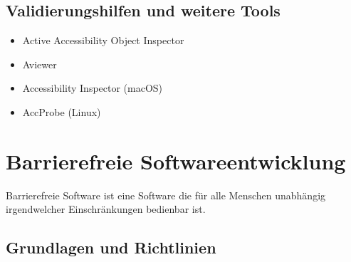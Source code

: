 \documentclass[paper=a4, fontsize=11pt]{scrartcl} %
\numberwithin{equation}{section} %
\numberwithin{figure}{section} %
\numberwithin{table}{section} %
\begin{document}
\subsection{Validierungshilfen und weitere Tools}

\begin{itemize}
\item Active Accessibility Object Inspector
\item Aviewer
\item Accessibility Inspector (macOS)
\item AccProbe (Linux)
\end{itemize}

\section{Barrierefreie Softwareentwicklung}

Barrierefreie Software ist eine Software die für alle Menschen unabhängig irgendwelcher Einschränkungen bedienbar ist.

\subsection{Grundlagen und Richtlinien}
\end{document}
